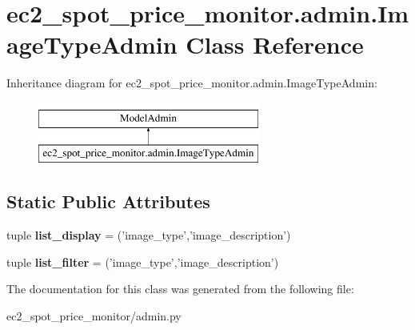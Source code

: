 \hypertarget{classec2__spot__price__monitor_1_1admin_1_1ImageTypeAdmin}{\section{ec2\-\_\-spot\-\_\-price\-\_\-monitor.\-admin.\-Image\-Type\-Admin Class Reference}
\label{classec2__spot__price__monitor_1_1admin_1_1ImageTypeAdmin}
}
Inheritance diagram for ec2\-\_\-spot\-\_\-price\-\_\-monitor.\-admin.\-Image\-Type\-Admin\-:\begin{figure}[H]
\begin{center}
\leavevmode
\includegraphics[height=2.000000cm]{classec2__spot__price__monitor_1_1admin_1_1ImageTypeAdmin}
\end{center}
\end{figure}
\subsection*{Static Public Attributes}
\begin{DoxyCompactItemize}
\item 
\hypertarget{classec2__spot__price__monitor_1_1admin_1_1ImageTypeAdmin_aa0aafa3bee9666c6cea631024e7d839e}{tuple {\bfseries list\-\_\-display} = ('image\-\_\-type','image\-\_\-description')}\label{classec2__spot__price__monitor_1_1admin_1_1ImageTypeAdmin_aa0aafa3bee9666c6cea631024e7d839e}

\item 
\hypertarget{classec2__spot__price__monitor_1_1admin_1_1ImageTypeAdmin_a263c52ae6a84b6660ccda75730d1626a}{tuple {\bfseries list\-\_\-filter} = ('image\-\_\-type','image\-\_\-description')}\label{classec2__spot__price__monitor_1_1admin_1_1ImageTypeAdmin_a263c52ae6a84b6660ccda75730d1626a}

\end{DoxyCompactItemize}


The documentation for this class was generated from the following file\-:\begin{DoxyCompactItemize}
\item 
ec2\-\_\-spot\-\_\-price\-\_\-monitor/admin.\-py\end{DoxyCompactItemize}
